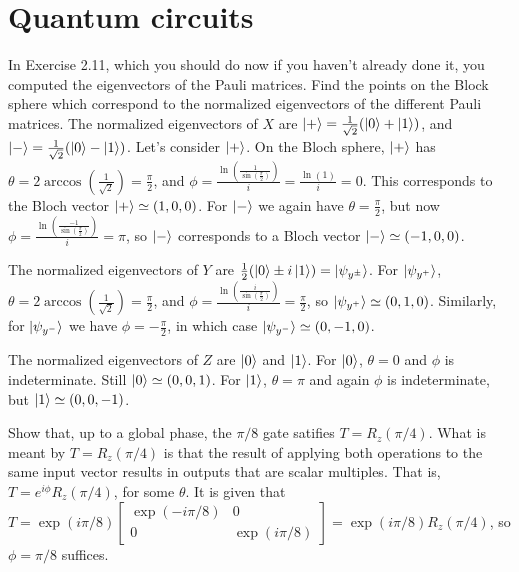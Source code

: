 
\chapter{Quantum circuits}
 In Exercise 2.11, which you should do now if you haven't already done it, you computed the eigenvectors of the Pauli matrices.  Find the points on the Block sphere which correspond to the normalized eigenvectors of the different Pauli matrices.
\Soln The normalized eigenvectors of $X$ are $\ket{+} = \frac{1}{\sqrt{2}}(\ket{0}+\ket{1})$, and $\ket{-} = \frac{1}{\sqrt{2}}(\ket{0}-\ket{1})$.  Let's consider $\ket{+}$.  On the Bloch sphere, $\ket{+}$ has $\theta = 2\arccos(\frac{1}{\sqrt{2}}) = \frac{\pi}{2}$, and $\phi = \frac{\ln\left(\frac{1}{\sin(\frac{\pi}{2})}\right)}{i} = \frac{\ln(1)}{i} = 0$. This corresponds to the Bloch vector $\ket{+} \simeq (1, 0, 0)$.  For $\ket{-}$ we again have $\theta = \frac{\pi}{2}$, but now $\phi = \frac{\ln\left(\frac{-1}{\sin(\frac{\pi}{2})}\right)}{i} = \pi$, so $\ket{-}$ corresponds to a Bloch vector $\ket{-}\simeq (-1, 0, 0)$. 

The normalized eigenvectors of $Y$ are $\frac{1}{2}(\ket{0}\pm i\ket{1}) = \ket{\psi_{y^\pm}}$.  For $\ket{\psi_{y^+}}$, $\theta = 2\arccos(\frac{1}{\sqrt{2}}) = \frac{\pi}{2}$, and $\phi = \frac{\ln\left(\frac{i}{\sin(\frac{\pi}{2})}\right)}{i} = \frac{\pi}{2}$, so $\ket{\psi_{y^+}} \simeq (0, 1, 0)$.  Similarly, for $\ket{\psi_{y^-}}$ we have $\phi = -\frac{\pi}{2}$, in which case $\ket{\psi_{y^-}} \simeq (0, -1, 0)$.

The normalized eigenvectors of $Z$ are $\ket{0}$ and $\ket{1}$.  For $\ket{0}$, $\theta = 0$ and $\phi$ is indeterminate.  Still $\ket{0} \simeq (0, 0, 1)$.  For $\ket{1}$, $\theta = \pi$ and again $\phi$ is indeterminate, but $\ket{1} \simeq (0, 0, -1)$.

\begin{comment}
\Textbf{4.2} Let $x$ be a real number and $A$ a matrix such that $A^2 = I$.  Show that $$\exp(iAx) = \cos(x)I+i\sin(x)A.$$ Use this result to verify Equations (4.4) through (4.6).
\Soln If $A$ is assumed to be normal, and hence has a spectral decomposition, then $A=\sum_a a\kb{a}$ and 
\begin{align*}
\exp(iAx) &= \sum_a \exp(iax)\kb{a} \\
&= \sum_{j=0}^{\infty}\sum_a \frac{ax}{j!}\kb{a} \\
&= \sum_{j=0}^{\infty}\sum_a \frac{ax}{(2j)!}\kb{a} + \sum_{j=0}^{\infty}\sum_a \frac{ax}{(2j+1)!}\kb{a}
\end{align*}
\end{comment}
 Show that, up to a global phase, the $\pi/8$ gate satifies $T=R_z(\pi/4)$.
\Soln What is meant by $T=R_z(\pi/4)$ is that the result of applying both operations to the same input vector results in outputs that are scalar multiples. That is, $T = e^{i\phi}R_z(\pi/4)$, for some $\theta$.  It is given that $T = \exp(i\pi/8)\begin{bmatrix}\exp(-i\pi/8) & 0 \\ 0 & \exp(i\pi/8)\end{bmatrix} = \exp(i\pi/8)R_z(\pi/4)$, so $\phi = \pi/8$ suffices.

